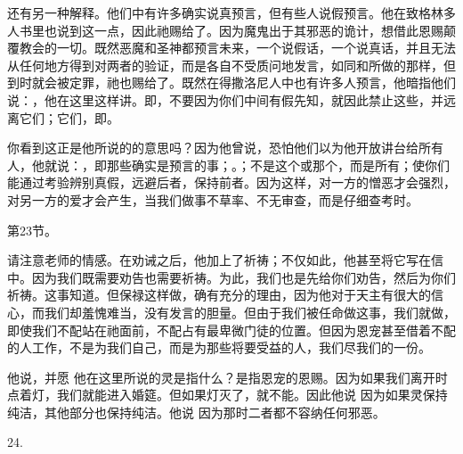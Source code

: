 还有另一种解释。他们中有许多确实说真预言，但有些人说假预言。他在致格林多人书里也说到这一点，因此祂赐给了。因为魔鬼出于其邪恶的诡计，想借此恩赐颠覆教会的一切。既然恶魔和圣神都预言未来，一个说假话，一个说真话，并且无法从任何地方得到对两者的验证，而是各自不受质问地发言，如同和所做的那样，但到时就会被定罪，祂也赐给了。既然在得撒洛尼人中也有许多人预言，他暗指他们说：，他在这里这样讲。即，不要因为你们中间有假先知，就因此禁止这些，并远离它们；它们，即。\par

你看到这正是他所说的的意思吗？因为他曾说，恐怕他们以为他开放讲台给所有人，他就说：，即那些确实是预言的事；。；不是这个或那个，而是所有；使你们能通过考验辨别真假，远避后者，保持前者。因为这样，对一方的憎恶才会强烈，对另一方的爱才会产生，当我们做事不草率、不无审查，而是仔细查考时。\par

第23节。\par

请注意老师的情感。在劝诫之后，他加上了祈祷；不仅如此，他甚至将它写在信中。因为我们既需要劝告也需要祈祷。为此，我们也是先给你们劝告，然后为你们祈祷。这事知道。但保禄这样做，确有充分的理由，因为他对于天主有很大的信心，而我们却羞愧难当，没有发言的胆量。但由于我们被任命做这事，我们就做，即使我们不配站在祂面前，不配占有最卑微门徒的位置。但因为恩宠甚至借着不配的人工作，不是为我们自己，而是为那些将要受益的人，我们尽我们的一份。\par

 他说，并愿 他在这里所说的灵是指什么？是指恩宠的恩赐。因为如果我们离开时点着灯，我们就能进入婚筵。但如果灯灭了，就不能。因此他说 因为如果灵保持纯洁，其他部分也保持纯洁。他说 因为那时二者都不容纳任何邪恶。\par

24. \par

